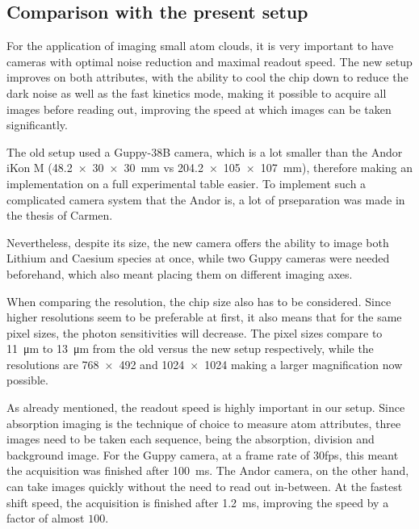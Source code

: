 \subsection{Comparison with the present setup}
For the application of imaging small atom clouds, it is very important to have cameras with optimal noise reduction and maximal readout speed. The new setup improves on both attributes, with the ability to cool the chip down to reduce the dark noise as well as the fast kinetics mode, making it possible to acquire all images before reading out, improving the speed at which images can be taken significantly.

The old setup used a Guppy-38B camera, which is a lot smaller than the Andor iKon M  (\SI{48.2x30x30}{\milli\meter} vs \SI{204.2x105x107}{\milli\meter}), therefore making an implementation on a full experimental table easier. To implement such a complicated camera system that the Andor is, a lot of prseparation was made in the thesis of Carmen. 

Nevertheless, despite its size, the new camera offers the ability to image both Lithium and Caesium species at once, while two Guppy cameras were needed beforehand, which also meant placing them on different imaging axes.

When comparing the resolution, the chip size also has to be considered. Since higher resolutions seem to be preferable at first, it also means that for the same pixel sizes, the photon sensitivities will decrease. The pixel sizes compare to \SI{11}{\micro\meter} to \SI{13}{\micro\meter} from the old versus the new setup respectively, while the resolutions are \SI{768x492}{} and \SI{1024x1024}{} making a larger magnification now possible.

As already mentioned, the readout speed is highly important in our setup. Since absorption imaging is the technique of choice to measure atom attributes, three images need to be taken each sequence, being the absorption, division and background image.
For the Guppy camera, at a frame rate of 30fps, this meant the acquisition was finished after \SI{100}{\milli\second}. The Andor camera, on the other hand, can take images quickly without the need to read out in-between. At the fastest shift speed, the acquisition is finished after \SI{1.2}{\milli\second}, improving the speed by a factor of almost $100$.

